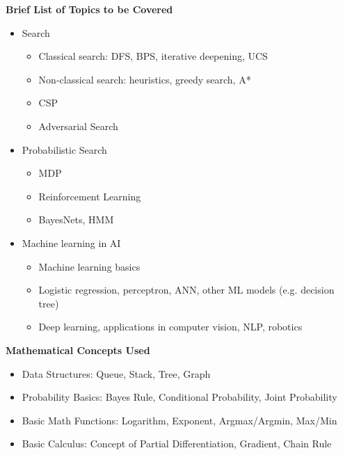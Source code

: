 {    \noindent \textbf{Brief List of Topics to be Covered}
    \begin{itemize}
        \item Search
        \begin{itemize}
            \item Classical search: DFS, BPS, iterative deepening, UCS
            \item Non-classical search: heuristics, greedy search, A*
            \item CSP
            \item Adversarial Search
        \end{itemize}
        \item Probabilistic Search
        \begin{itemize}
            \item MDP
            \item Reinforcement Learning
            \item BayesNets, HMM
        \end{itemize}
        \item Machine learning in AI
        \begin{itemize}
            \item Machine learning basics
            \item Logistic regression, perceptron, ANN, other ML models (e.g. decision tree)
            \item Deep learning, applications in computer vision, NLP, robotics
        \end{itemize}
    \end{itemize}
    
    \noindent \textbf{Mathematical Concepts Used}
    \begin{itemize}
        \item Data Structures: Queue, Stack, Tree, Graph
        \item Probability Basics: Bayes Rule, Conditional Probability, Joint Probability
        \item Basic Math Functions: Logarithm, Exponent, Argmax/Argmin, Max/Min
        \item Basic Calculus: Concept of Partial Differentiation, Gradient, Chain Rule
    \end{itemize}
}

